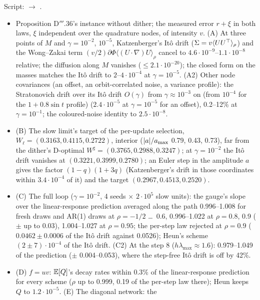 Script:  $\to$ .
\begin{itemize}
  \item Proposition D$'''$.36's instance without dither; the measured error $r + \xi$ in both laws, $\xi$ independent
    over the quadrature nodes, of intensity $v$. (A) At three points of $M$ and $\gamma = 10^{-2}$, $10^{-5}$,
    Katzenberger's It\^o drift ($\Sigma = v\langle UU^\top\rangle_\rho$) and the Wong--Zakai term
    $(v/2)\partial\Phi\langle(U\cdot\nabla)U\rangle_\rho$ cancel to $4.6\cdot10^{-9}$--$1.1\cdot10^{-8}$ relative; the
    diffusion along $M$ vanishes ($\le2.1\cdot10^{-20}$); the closed form on the masses matches the It\^o drift to
    $2$--$4\cdot10^{-4}$ at $\gamma = 10^{-5}$. (A2) Other node covariances (an offset, an orbit-correlated noise, a
    variance profile): the Stratonovich drift over its It\^o drift $O(\gamma)$ from $\gamma\approx10^{-3}$ on (from
    $10^{-4}$ for the $1 + 0.8\sin t$ profile) ($2.4\cdot10^{-5}$ at $\gamma = 10^{-5}$ for an offset), 0.2--12\% at
    $\gamma = 10^{-1}$; the coloured-noise identity to $2.5\cdot10^{-8}$.
  \item (B) The slow limit's target of the per-update selection, $W_\ell = (0.3163, 0.4115, 0.2722)$, interior
    ($\lvert a\rvert/a_{\max}$ 0.79, 0.43, 0.73), far from the dither's D-optimal $W^\sharp = (0.3765, 0.2988, 0.3247)$; at
    $\gamma = 10^{-2}$ the It\^o drift vanishes at $(0.3221, 0.3999, 0.2780)$; an Euler step in the amplitude $a$ gives
    the factor $(1 - q)(1 + 3q)$ (Katzenberger's drift in those coordinates within $3.4\cdot10^{-4}$ of it) and the
    target $(0.2967, 0.4513, 0.2520)$.
  \item (C) The full loop ($\gamma = 10^{-2}$, 4 seeds $\times$ $2\cdot10^5$ slow units): the gauge's slope over the
    linear-response prediction averaged along the path 0.996--1.008 for fresh draws and AR(1) draws at
    $\rho = -1/2$ \dots\ 0.6, 0.996--1.022 at $\rho = 0.8$, 0.9 ($\pm$ up to 0.03), 1.004--1.027 at $\rho = 0.95$; the
    per-step law rejected at $\rho = 0.9$ ($0.0462\pm0.0006$ of the It\^o drift against 0.0526); Heun's scheme
    $(2\pm7)\cdot10^{-4}$ of the It\^o drift. (C2) At the step 8 ($h\lambda_{\max}\approx1.6$): 0.979--1.049 of the
    prediction ($\pm$ 0.004--0.053), where the step-free It\^o drift is off by 42\%.
  \item (D) $f = uv$: $\mathbb{E}[Q]$'s decay rates within 0.3\% of the linear-response prediction for every scheme ($\rho$ up
    to 0.999, 0.19 of the per-step law there); Heun keeps $Q$ to $1.2\cdot10^{-5}$. (E) The diagonal network: the

\end{itemize}
